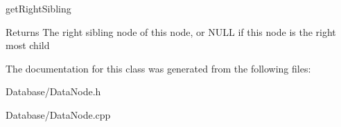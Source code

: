get\+Right\+Sibling 

\begin{DoxyReturn}{Returns}
The right sibling node of this node, or N\+U\+LL if this node is the right most child 
\end{DoxyReturn}


The documentation for this class was generated from the following files\+:\begin{DoxyCompactItemize}
\item 
Database/Data\+Node.\+h\item 
Database/Data\+Node.\+cpp\end{DoxyCompactItemize}
